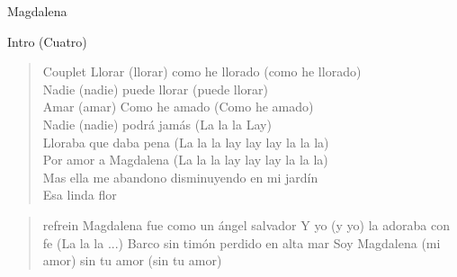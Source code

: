 \begin{song}{Magdalena}

\begin{instrumental}{Intro (Cuatro)}
   
\end{instrumental}


\begin{verse}{Couplet}
Llorar (llorar) como he llorado (como he llorado)\\
Nadie (nadie) puede llorar (puede llorar)\\
Amar (amar) Como he amado (Como he amado)\\
Nadie (nadie) podrá jamás (La la la Lay) \\
Lloraba que daba pena (La la la lay lay lay la la la)\\
Por amor a Magdalena (La la la lay lay lay la la la)\\
Mas ella me abandono disminuyendo en mi jardín\\
Esa linda flor
\end{verse}


\begin{verse}{refrein}
Magdalena fue como un ángel salvador
Y yo (y yo) la adoraba con fe (La la la ...)
Barco sin timón perdido en alta mar
Soy Magdalena (mi amor) sin tu amor (sin tu amor)
\end{verse}

\end{song}
